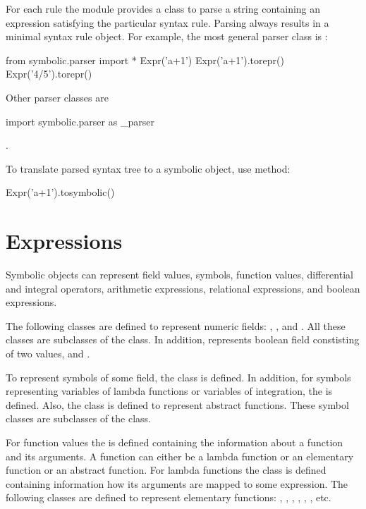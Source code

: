 \documentclass[a4paper,12pt]{article}
\begin{document}
For each rule the  module provides a class to parse a
string containing an expression satisfying the particular syntax rule. 
Parsing always results in a minimal syntax rule object.
For example, the most general parser class is :
\begin{python}
from symbolic.parser import *
Expr('a+1')
Expr('a+1').torepr()
Expr('4/5').torepr()
\end{python}
Other parser classes are
\begin{python*}
import symbolic.parser as _parser
\end{python*}
%
.

To translate parsed syntax tree to a symbolic object, use  method:
\begin{python}
Expr('a+1').tosymbolic()
\end{python}


\section{Expressions}
\label{sec:expressions}

Symbolic objects can represent field values, symbols, function values,
differential and integral operators, arithmetic expressions,
relational expressions, and boolean expressions.

The following classes are defined to represent numeric fields:
, , and . All these
classes are subclasses of the  class. In addition,
 represents boolean field constisting of two values,
 and .

To represent symbols of some field, the  class is
defined. In addition, for symbols representing variables of lambda
functions or variables of integration, the  is
defined. Also, the  class is defined to
represent abstract functions. These symbol classes are subclasses of
the  class.

For function values the  is defined containing the
information about a function and its arguments. A function can either
be a lambda function or an elementary function or an abstract
function. For lambda functions the  class is defined
containing information how its arguments are mapped to some expression.
The following classes are defined to represent elementary functions:
, , , , ,
, etc.
\end{document}
